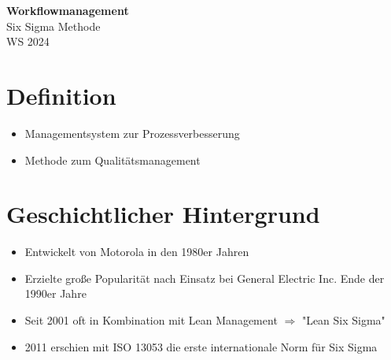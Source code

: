 \documentclass[11pt]{article}
\begin{document}
\thispagestyle{empty}

\newcommand{\ol}[1]{\begin{enumerate}#1\end{enumerate}}
\newcommand{\ul}[1]{\begin{itemize}#1\end{itemize}}
\begin{center}
  {\LARGE \bf Workflowmanagement}\\
  {\Large Six Sigma Methode}\\
  WS 2024
\end{center}

\section{Definition}
\ul{
  \item Managementsystem zur Prozessverbesserung
  \item Methode zum Qualitätsmanagement
}

\section{Geschichtlicher Hintergrund}
\ul{
  \item Entwickelt von Motorola in den 1980er Jahren
  \item Erzielte große Popularität nach Einsatz bei General Electric Inc. Ende der 1990er Jahre
  \item Seit 2001 oft in Kombination mit Lean Management $\Longrightarrow$ "Lean Six Sigma"
  \item 2011 erschien mit ISO 13053 die erste internationale Norm für Six Sigma
}
\end{document}
